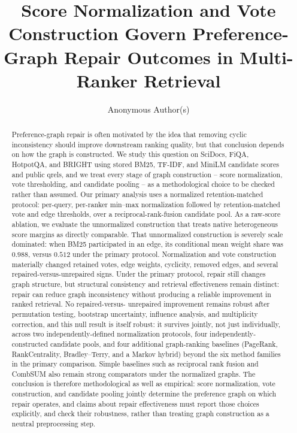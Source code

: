 \documentclass[manuscript,anonymous,review]{acmart}
\title{Score Normalization and Vote Construction Govern Preference-Graph
  Repair Outcomes in Multi-Ranker Retrieval}
\author{Anonymous Author(s)}
\affiliation{%
  \institution{Institution redacted for review}
  \country{}
}
\begin{document}
\begin{abstract}
Preference-graph repair is often motivated by the idea that removing cyclic
inconsistency should improve downstream ranking quality, but that conclusion
depends on how the graph is constructed. We study this question on SciDocs,
FiQA, HotpotQA, and BRIGHT using stored BM25, TF-IDF, and MiniLM candidate
scores and public qrels, and we treat every stage of graph construction --
score normalization, vote thresholding, and candidate pooling -- as a
methodological choice to be checked rather than assumed. Our primary
analysis uses a normalized retention-matched protocol: per-query, per-ranker
min--max normalization followed by retention-matched vote and edge
thresholds, over a reciprocal-rank-fusion candidate pool. As a raw-score
ablation, we evaluate the unnormalized construction that treats native
heterogeneous score margins as directly comparable. That unnormalized
construction is severely scale dominated: when BM25 participated in an edge,
its conditional mean weight share was $0.988$, versus $0.512$ under the
primary protocol. Normalization and vote construction materially changed
retained votes, edge weights, cyclicity, removed edges, and several
repaired-versus-unrepaired signs. Under the primary protocol, repair still
changes graph structure, but structural consistency and retrieval
effectiveness remain distinct: repair can reduce graph inconsistency without
producing a reliable improvement in ranked retrieval. No repaired-versus-
unrepaired improvement remains robust after permutation testing, bootstrap
uncertainty, influence analysis, and multiplicity correction, and this null
result is itself robust: it survives jointly, not just individually, across
two independently-defined normalization protocols, four independently-
constructed candidate pools, and four additional graph-ranking baselines
(PageRank, RankCentrality, Bradley--Terry, and a Markov hybrid) beyond the
six method families in the primary comparison. Simple baselines such as
reciprocal rank fusion and CombSUM also remain strong comparators under the
normalized graphs. The conclusion is therefore methodological as well as
empirical: score normalization, vote construction, and candidate pooling
jointly determine the preference graph on which repair operates, and claims
about repair effectiveness must report those choices explicitly, and check
their robustness, rather than treating graph construction as a neutral
preprocessing step.
\end{abstract}

\maketitle
\end{document}
